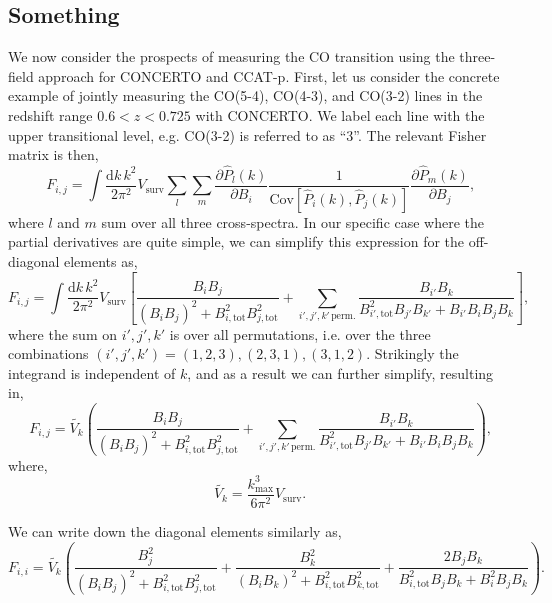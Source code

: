 \documentclass{aastex62}
\newcommand{\CO}{\ensuremath{\text{CO}}}
\newcommand{\beq}{\begin{equation}}
\newcommand{\eeq}{\end{equation}}
\newcommand{\Cov}[2]{\mathrm{Cov}[#1,#2]}
\begin{document}
\subsection{Something} \label{ssec:co_}
We now consider the prospects of measuring the \CO{} transition using the
three-field approach for CONCERTO and CCAT-p. First, let us consider the
concrete example of jointly measuring the CO(5-4), CO(4-3), and CO(3-2) lines
in the redshift range $0.6 < z < 0.725$ with CONCERTO. We label each line with
the upper transitional level, e.g. CO(3-2) is referred to as ``3''. The
relevant Fisher matrix is then,
\beq\label{eq:co_fisher}
F_{i,j} = 
\int \frac{\text{d}k\,k^2}{2\pi^2} 
V_{\text{surv}} \sum_{l} \sum_{m} 
\frac{\partial \hat{P}_l(k)}{\partial B_i}
\frac{1}{\Cov{\hat{P}_i(k)}{\hat{P}_j(k)}} 
\frac{\partial \hat{P}_m(k)}{\partial B_j}\text{,}
\eeq
where $l$ and $m$ sum over all three cross-spectra. In our specific case where
the partial derivatives are quite simple, we can simplify this expression for
the off-diagonal elements as,
\beq\label{eq:fisher_simple}
F_{i,j} =
\int \frac{\text{d}k\,k^2}{2\pi^2} 
V_{\text{surv}}
\left[
\frac{B_i B_j}{(B_i B_j)^2 + B_{i,\text{tot}}^2B_{j,\text{tot}}^2}
+\sum_{i', j', k'\,\text{perm.}}
\frac{B_{i'} B_k}{B_{i', \text{tot}}^2 B_{j'} B_{k'} + B_{i'} B_i B_j B_k}
\right]\text{,}
\eeq
where the sum on $i', j', k'$ is over all permutations, i.e. over the three
combinations $(i', j', k') = (1, 2, 3), (2, 3, 1), (3, 1, 2)$. Strikingly the
integrand is independent of $k$, and as a result we can further simplify,
resulting in,
\beq\label{eq:fisher_super_simple}
F_{i,j} = 
\tilde{V_k}
\left(
\frac{B_i B_j}{(B_i B_j)^2 + B_{i,\text{tot}}^2B_{j,\text{tot}}^2}
+\sum_{i', j', k'\,\text{perm.}}
\frac{B_{i'} B_k}{B_{i', \text{tot}}^2 B_{j'} B_{k'} + B_{i'} B_i B_j B_k}
\right)\text{,}
\eeq
where,
\beq\label{eq:Vk}
\tilde{V_k} = \frac{k_{\text{max}}^3}{6\pi^2} V_{\text{surv}}\text{.}
\eeq

We can write down the diagonal elements similarly as,
\beq\label{eq:fisher_offdiagonal}
F_{i,i} = \tilde{V_k}
\left(
\frac{B_j^2}{(B_iB_j)^2+B_{i,\text{tot}}^2B_{j,\text{tot}}^2}
+\frac{B_k^2}{(B_iB_k)^2+B_{i,\text{tot}}^2B_{k,\text{tot}}^2}
+\frac{2B_j B_k}{B_{i,\text{tot}}^2B_jB_k + B_i^2B_jB_k}
\right)\text{.}
\eeq




\end{document}
